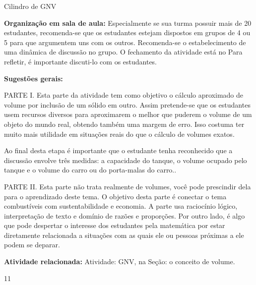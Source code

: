 \begin{sugestions}{Cilindro de GNV}
{
\textbf{Organização em sala de aula:} Especialmente se sua turma possuir mais de 20 estudantes, recomenda-se que os estudantes estejam dispostos em grupos de 4 ou 5 para que argumentem uns com os outros. Recomenda-se o estabelecimento de uma dinâmica de discussão no grupo. O fechamento da atividade está no Para refletir, é importante discuti-lo com os estudantes.

\textbf{Sugestões gerais:}

PARTE I. Esta parte da atividade tem como objetivo o cálculo aproximado de volume por inclusão de um sólido em outro. Assim pretende-se que os estudantes usem recursos diversos para aproximarem o melhor que puderem o volume de um objeto do mundo real, obtendo também uma margem de erro. Isso costuma ter muito mais utilidade em situações reais do que o cálculo de volumes exatos.

Ao final desta etapa é importante que o estudante tenha reconhecido que a discussão envolve três medidas: a capacidade do tanque, o volume ocupado pelo tanque e o volume do carro ou do porta-malas do carro..

PARTE II. Esta parte não trata realmente de volumes, você pode prescindir dela para o aprendizado deste tema. O objetivo desta parte é conectar o tema combustíveis com sustentabilidade e economia. A parte usa raciocínio lógico, interpretação de texto e domínio de razões e proporções. Por outro lado, é algo que pode despertar o interesse dos estudantes pela matemática por estar diretamente relacionada a situações com as quais ele ou pessoas próximas a ele podem se deparar.

\textbf{Atividade relacionada:} Atividade: GNV, na Seção: o conceito de volume.
}{1}{1}
\end{sugestions}
